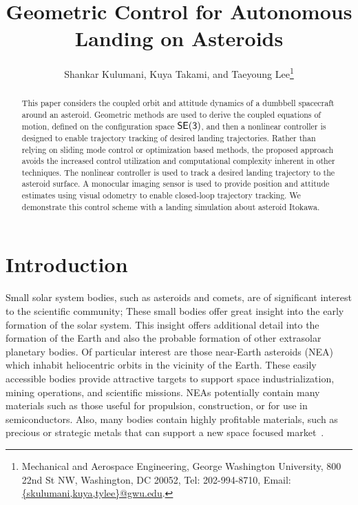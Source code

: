 \documentclass[letterpaper, paper,11pt]{AAS}		%
\begin{document}
\title{Geometric Control for Autonomous Landing on Asteroids}

\author{Shankar Kulumani, Kuya Takami, and Taeyoung Lee\thanks{Mechanical and Aerospace Engineering, George Washington University, 800 22nd St NW, Washington, DC 20052, Tel: 202-994-8710, Email: \href{mailto:skulumani@gwu.edu}{\{skulumani,kuya,tylee\}@gwu.edu}.}
}


\maketitle{} 		

\begin{abstract}
    This paper considers the coupled orbit and attitude dynamics of a dumbbell spacecraft around an asteroid. 
    Geometric methods are used to derive the coupled equations of motion, defined on the configuration space \(\mathsf{SE(3)}\), and then a nonlinear controller is designed to enable trajectory tracking of desired landing trajectories.
    Rather than relying on sliding mode control or optimization based methods, the proposed approach avoids the increased control utilization and computational complexity inherent in other techniques.
    The nonlinear controller is used to track a desired landing trajectory to the asteroid surface. 
    A monocular imaging sensor is used to provide position and attitude estimates using visual odometry to enable closed-loop trajectory tracking.
    We demonstrate this control scheme with a landing simulation about asteroid Itokawa.
\end{abstract}

\section{Introduction}\label{sec:introduction}
Small solar system bodies, such as asteroids and comets, are of significant interest to the scientific community; These small bodies offer great insight into the early formation of the solar system.
This insight offers additional detail into the formation of the Earth and also the probable formation of other extrasolar planetary bodies.
Of particular interest are those near-Earth asteroids (NEA) which inhabit heliocentric orbits in the vicinity of the Earth.
These easily accessible bodies provide attractive targets to support space industrialization, mining operations, and scientific missions.
NEAs potentially contain many materials such as those useful for propulsion, construction, or for use in semiconductors.
Also, many bodies contain highly profitable materials, such as precious or strategic metals that can support a new space focused market~\cite{ross2001}.
\end{document}

